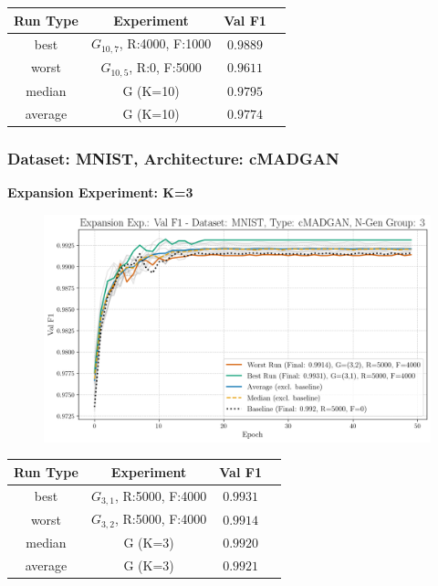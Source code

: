 \begin{table}[H]
	\vspace{-1em}
	\centering
	\begin{tabular}{|c|c|c|c|}
		\hline
		Run Type & Experiment & Val F1 \\ \hline
		best & \(G_{10, 7}\), R:4000, F:1000 & $0.9889$\\ \hline
		worst & \(G_{10, 5}\), R:0, F:5000 & $0.9611$\\ \hline
		median & G (K=10) & $0.9795$\\ \hline
		average & G (K=10) & $0.9774$
		\\ \hline
	\end{tabular}
\end{table}
\newpage
\subsubsection{Dataset: MNIST, Architecture: cMADGAN}
\noindent\textbf{Expansion Experiment: K=3}
\begin{figure}[htbp]
	\centering
	\includegraphics[width=.85\textwidth]{abb/strat_classifier_performance/MNIST_STRATIFIED_CLASSIFIERS_cMADGAN_NEW/expansion_experiments/val_f1_score_cMADGAN_MNIST_n_gen_3_all.png}
	\label{fig:app_strat_class_performance_expansion_exp._val_f1_score_3}
\end{figure}
\begin{table}[H]
	\vspace{-1em}
	\centering
	\begin{tabular}{|c|c|c|c|}
		\hline
		Run Type & Experiment & Val F1 \\ \hline
		best & \(G_{3, 1}\), R:5000, F:4000 & $0.9931$\\ \hline
		worst & \(G_{3, 2}\), R:5000, F:4000 & $0.9914$\\ \hline
		median & G (K=3) & $0.9920$\\ \hline
		average & G (K=3) & $0.9921$
		\\ \hline
	\end{tabular}
\end{table}
